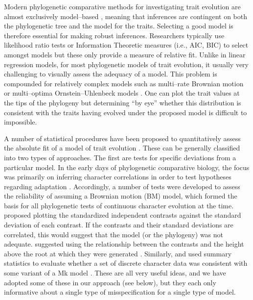 \documentclass[a4paper,11pt]{article}
\begin{document}
Modern phylogenetic comparative methods for investigating trait evolution are almost exclusively model--based \citep[recently reviewed in][]{Omeara2012, PennellHarmon}, meaning that inferences are contingent on both the phylogenetic tree and the model for the traits. Selecting a good model is therefore essential for making robust inferences. Researchers typically use likelihood ratio tests or Information Theoretic measures (i.e., AIC, BIC) to select amongst models \citep{Mooers1999, Harmon2010, Hunt2012} but these only provide a measure of relative fit. Unlike in linear regression models, for most phylogenetic models of trait evolution, it usually very challenging to visually assess the adequacy of a model. This problem is compounded for relatively complex models such as multi--rate Brownian motion \citep{Omeara2006, Eastman2011} or multi--optima Ornstein--Uhlenbeck models \citep{Hansen1997, ButlerKing2004, Beaulieu2012, UyedaBayou}. One can plot the trait values at the tips of the phylogeny but determining ``by eye'' whether this distribution is consistent with the traits having evolved under the proposed model is difficult to impossible.

A number of statistical procedures have been proposed to quantitatively assess the absolute fit of a model of trait evolution \citep[e.g.,][]{Garland1992, Garland1993, Purvis1995, Diaz1996, FreckletonHarvey2006, Boettiger2012, SlaterPennell, Beaulieu2013, Blackmon2014}. These can be generally classified into two types of approaches. The first are tests for specific deviations from a particular model.
In the early days of phylogenetic comparative biology, the focus was primarily on inferring character correlations in order to test hypotheses regarding adaptation \citep[e.g.,][]{Felsenstein1985, Grafen1989, HarveyPagel1991, Lynch1991}. Accordingly, a number of tests were developed to assess the reliability of assuming a Brownian motion (BM) model, which formed the basis for all phylogenetic tests of continuous character evolution at the time. \citet{Garland1992} proposed plotting the standardized independent contrasts \citep[\emph{sensu}][]{Felsenstein1985} against the standard deviation of each contrast. If the contrasts and their standard deviations are correlated, this would suggest that the model (or the phylogeny) was not adequate. \citet{Purvis1995} suggested using the relationship between the contrasts and the height above the root at which they were generated \citep[see also][for a slight modification of this test]{FreckletonHarvey2006}. Similarly, \citet{Beaulieu2013} and \citet{Blackmon2014} used summary statistics to evaluate whether a set of discrete character data was consistent with some variant of a Mk model \citep{Pagel1994, Lewis2001}. These are all very useful ideas, and we have adopted some of these in our approach (see below), but they each only informative about a single type of misspecification for a single type of model.
\end{document}
